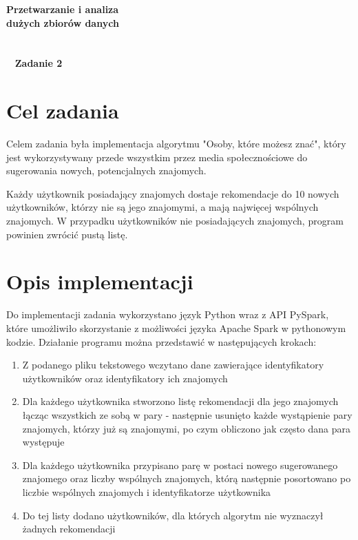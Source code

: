\documentclass[a4paper,11pt]{article}
\begin{document}
\begin{titlepage}
\begin{center}
\textbf{\Huge{Przetwarzanie i analiza\\}}
\textbf{\Huge{dużych zbiorów danych\\~\\~\\~}}
\textbf{\Huge{Zadanie 2}}
\end{center}

\end{titlepage}

\setcounter{page}{2}

\tableofcontents

\newpage
\section{Cel zadania}

Celem zadania była implementacja algorytmu "Osoby, które możesz znać", który jest wykorzystywany przede wszystkim przez media społecznościowe do sugerowania nowych, potencjalnych znajomych.

Każdy użytkownik posiadający znajomych dostaje rekomendacje do 10 nowych użytkowników, którzy nie są jego znajomymi, a mają najwięcej wspólnych znajomych. W przypadku użytkowników nie posiadających znajomych, program powinien zwrócić pustą listę.

\section{Opis implementacji}

Do implementacji zadania wykorzystano język Python wraz z API PySpark, które umożliwiło skorzystanie z możliwości języka Apache Spark w pythonowym kodzie.
Działanie programu można przedstawić w następujących krokach:
\begin{enumerate}
    \item Z podanego pliku tekstowego wczytano dane zawierające identyfikatory użytkowników oraz identyfikatory ich znajomych
    \item Dla każdego użytkownika stworzono listę rekomendacji dla jego znajomych łącząc wszystkich ze sobą w pary - następnie usunięto każde wystąpienie pary znajomych, którzy już są znajomymi, po czym obliczono jak często dana para występuje
    \item Dla każdego użytkownika przypisano parę w postaci nowego sugerowanego znajomego oraz liczby wspólnych znajomych, którą następnie posortowano po liczbie wspólnych znajomych i identyfikatorze użytkownika
    \item Do tej listy dodano użytkowników, dla których algorytm nie wyznaczył żadnych rekomendacji
\end{enumerate}
\end{document}
